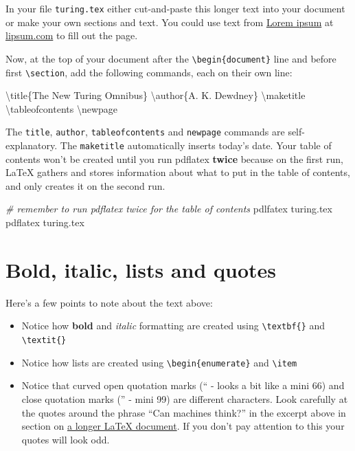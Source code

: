 \documentclass[
]{book}
\newenvironment{Shaded}{\begin{snugshade}}{\end{snugshade}}
\newcommand{\CommentTok}[1]{\textcolor[rgb]{0.56,0.35,0.01}{\textit{#1}}}
\newcommand{\FunctionTok}[1]{\textcolor[rgb]{0.00,0.00,0.00}{#1}}
\newcommand{\NormalTok}[1]{#1}
\providecommand{\tightlist}{%
  \setlength{\itemsep}{0pt}\setlength{\parskip}{0pt}}
\begin{document}
In your file \texttt{turing.tex} either cut-and-paste this longer text into your document or make your own sections and text. You could use text from \href{https://en.wikipedia.org/wiki/Lorem_ipsum}{Lorem ipsum} at \href{https://www.lipsum.com}{lipsum.com} to fill out the page.

Now, at the top of your document after the \texttt{\textbackslash{}begin\{document\}} line and before first \texttt{\textbackslash{}section}, add the following commands, each on their own line:

\begin{Shaded}
\begin{Highlighting}[]
\FunctionTok{\textbackslash{}title}\NormalTok{\{The New Turing Omnibus\}}
\FunctionTok{\textbackslash{}author}\NormalTok{\{A. K. Dewdney\}}
\FunctionTok{\textbackslash{}maketitle}
\FunctionTok{\textbackslash{}tableofcontents}
\FunctionTok{\textbackslash{}newpage}
\end{Highlighting}
\end{Shaded}

The \texttt{title}, \texttt{author}, \texttt{tableofcontents} and \texttt{newpage} commands are self-explanatory. The \texttt{maketitle} automatically inserts today's date. Your table of contents won't be created until you run pdflatex \textbf{twice} because on the first run, LaTeX gathers and stores information about what to put in the table of contents, and only creates it on the second run.

\begin{Shaded}
\begin{Highlighting}[]
\CommentTok{\# remember to run pdflatex twice for the table of contents}
\NormalTok{pdlfatex turing.tex}
\NormalTok{pdflatex turing.tex}
\end{Highlighting}
\end{Shaded}

\hypertarget{bold-italic-lists-and-quotes}{%
\section{Bold, italic, lists and quotes}\label{bold-italic-lists-and-quotes}}

Here's a few points to note about the text above:

\begin{itemize}
\tightlist
\item
  Notice how \textbf{bold} and \emph{italic} formatting are created using \texttt{\textbackslash{}textbf\{\}} and \texttt{\textbackslash{}textit\{\}}
\item
  Notice how lists are created using \texttt{\textbackslash{}begin\{enumerate\}} and \texttt{\textbackslash{}item}
\item
  Notice that curved open quotation marks (`` - looks a bit like a mini 66) and close quotation marks ('' - mini 99) are different characters. Look carefully at the quotes around the phrase ``Can machines think?'' in the excerpt above in section on \protect\hyperlink{longer}{a longer LaTeX document}. If you don't pay attention to this your quotes will look odd.
\end{itemize}
\end{document}
